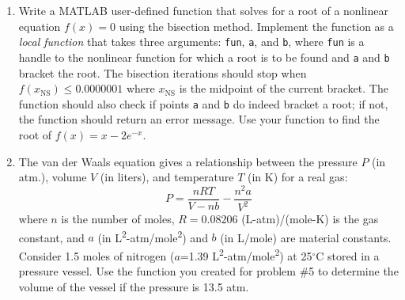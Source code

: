 \begin{fullwidth}
\begin{enumerate}
\item Write a MATLAB user-defined function that solves for a root of a nonlinear equation $f(x)=0$ using the bisection method.  Implement the function as a \emph{local function} that takes three arguments: \lstinline[style=myMatlab]{fun}, \lstinline[style=myMatlab]{a}, and \lstinline[style=myMatlab]{b}, where \lstinline[style=myMatlab]{fun} is a handle to the nonlinear function for which a root is to be found and \lstinline[style=myMatlab]{a} and \lstinline[style=myMatlab]{b} bracket the root.  The bisection iterations should stop when $f(x_{\text{NS}})\le 0.0000001$ where $x_{\text{NS}}$ is the midpoint of the current bracket.  The function should also check if points \lstinline[style=myMatlab]{a} and \lstinline[style=myMatlab]{b} do indeed bracket a root; if not, the function should return an error message.  Use your function to find the root of $f(x) = x-2e^{-x}$.  


\vspace{2.0cm}
\item The van der Waals equation gives a relationship between the pressure $P$ (in atm.), volume $V$ (in liters), and temperature $T$ (in K) for a real gas:
\begin{equation}
P = \frac{nRT}{V-nb}-\frac{n^2 a}{V^2}
\label{eq:ass1n-van-der-waals}
\end{equation}
where $n$ is the number of moles, $R=0.08206$ (L-atm)/(mole-K) is the gas constant, and $a$ (in L\textsuperscript{2}-atm/mole\textsuperscript{2}) and $b$ (in L/mole) are material constants.  Consider 1.5 moles of nitrogen ($a$=1.39 L\textsuperscript{2}-atm/mole\textsuperscript{2}) at 25$^{\circ}$C stored in a pressure vessel.  Use the function you created for problem \#5 to determine the volume of the vessel if the pressure is 13.5 atm.


\end{enumerate}

\end{fullwidth}
